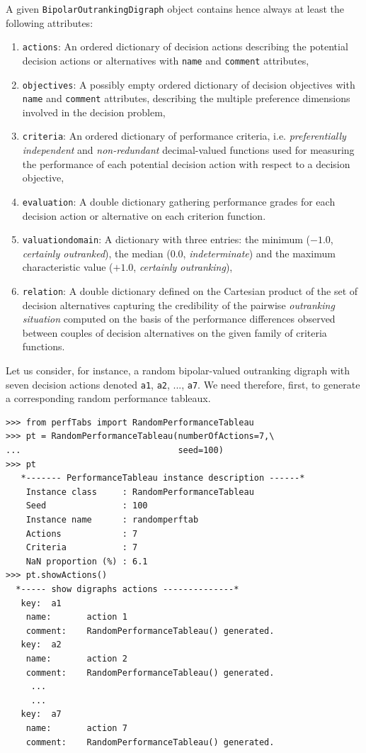 A given \texttt{BipolarOutrankingDigraph} object contains hence always at least the following attributes:
\begin{enumerate}
\item \texttt{actions}: An ordered dictionary of decision actions describing the potential decision actions or alternatives with {\tt name} and {\tt comment} attributes,
\item \texttt{objectives}: A possibly empty ordered dictionary of decision objectives with {\tt name} and {\tt comment} attributes, describing the multiple preference dimensions involved in the decision problem, 
\item \texttt{criteria}: An ordered dictionary of performance criteria, i.e. {\em preferentially independent\/} and {\em non-redundant\/} decimal-valued functions used for measuring the performance of each potential decision action with respect to a decision objective,
\item \texttt{evaluation}: A double dictionary gathering performance grades for each decision action or alternative on each criterion function. 
\item \texttt{valuationdomain}: A dictionary with three entries: the minimum ($-1.0$, \emph{certainly outranked}), the median ($0.0$, \emph{indeterminate}) and the maximum characteristic value ($+1.0$, \emph{certainly outranking}),
\item \texttt{relation}: A double dictionary defined on the Cartesian product of the set of decision alternatives capturing the credibility of the pairwise \emph{outranking situation} computed on the basis of the performance differences observed between couples of decision alternatives on the given family of criteria functions.   
\end{enumerate}

Let us consider, for instance, a random bipolar-valued outranking digraph with seven decision actions denoted \texttt{a1}, \texttt{a2}, ..., \texttt{a7}. We need therefore, first, to generate a corresponding random performance tableaux.
\begin{lstlisting}[caption={Generating a random performance tableau.},label=list:3.1]
>>> from perfTabs import RandomPerformanceTableau
>>> pt = RandomPerformanceTableau(numberOfActions=7,\
...                               seed=100)   
>>> pt
   *------- PerformanceTableau instance description ------*
    Instance class     : RandomPerformanceTableau
    Seed               : 100
    Instance name      : randomperftab
    Actions            : 7
    Criteria           : 7
    NaN proportion (%) : 6.1
>>> pt.showActions()
  *----- show digraphs actions --------------*
   key:  a1
    name:       action 1
    comment:    RandomPerformanceTableau() generated.
   key:  a2
    name:       action 2
    comment:    RandomPerformanceTableau() generated.
     ...
     ...
   key:  a7
    name:       action 7
    comment:    RandomPerformanceTableau() generated.
\end{lstlisting}

